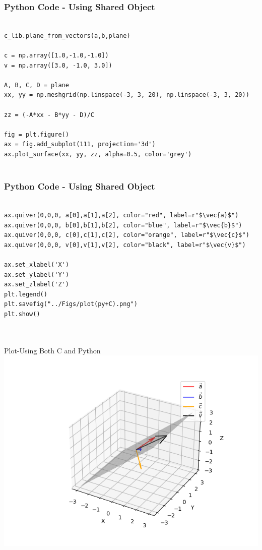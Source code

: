 \documentclass{beamer}
\begin{document}
\begin{frame}[fragile]
    \frametitle{Python Code - Using Shared Object}
    \begin{lstlisting}

c_lib.plane_from_vectors(a,b,plane)

c = np.array([1.0,-1.0,-1.0])
v = np.array([3.0, -1.0, 3.0])

A, B, C, D = plane
xx, yy = np.meshgrid(np.linspace(-3, 3, 20), np.linspace(-3, 3, 20))

zz = (-A*xx - B*yy - D)/C

fig = plt.figure()
ax = fig.add_subplot(111, projection='3d')
ax.plot_surface(xx, yy, zz, alpha=0.5, color='grey')


\end{lstlisting}
\end{frame}

\begin{frame}[fragile]
    \frametitle{Python Code - Using Shared Object}
    \begin{lstlisting}
    
ax.quiver(0,0,0, a[0],a[1],a[2], color="red", label=r"$\vec{a}$")
ax.quiver(0,0,0, b[0],b[1],b[2], color="blue", label=r"$\vec{b}$")
ax.quiver(0,0,0, c[0],c[1],c[2], color="orange", label=r"$\vec{c}$")
ax.quiver(0,0,0, v[0],v[1],v[2], color="black", label=r"$\vec{v}$")

ax.set_xlabel('X')
ax.set_ylabel('Y')
ax.set_zlabel('Z')
plt.legend()
plt.savefig("../Figs/plot(py+C).png")
plt.show()



\end{lstlisting}
\end{frame}

\begin{frame}{Plot-Using Both C and Python}
    \centering
    \includegraphics[width=\columnwidth, height=0.8\textheight, keepaspectratio]{Figs/plot(py+C).png}     
\end{frame}
\end{document}
